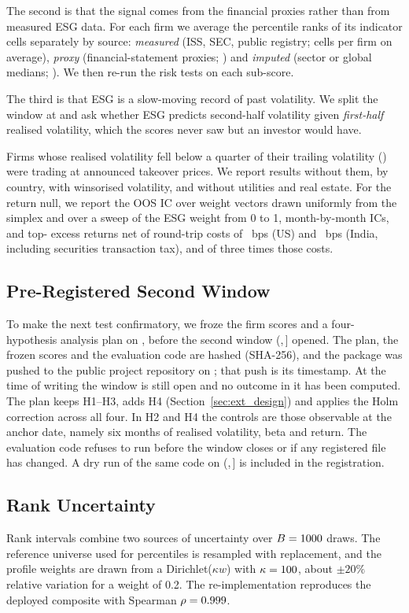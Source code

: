 The second is that the signal comes from the financial proxies rather than
from measured ESG data. For each firm we average the percentile ranks of its
indicator cells separately by source: \emph{measured} (ISS, SEC, public
registry; \CellsMeas cells per firm on average), \emph{proxy}
(financial-statement proxies; \CellsProxy) and \emph{imputed} (sector or
global medians; \CellsImp). We then re-run the risk tests on each sub-score.

The third is that ESG is a slow-moving record of past volatility. We split
the window at \SplitDate and ask whether ESG predicts second-half volatility
given \emph{first-half} realised volatility, which the scores never saw but
an investor would have.

Firms whose realised volatility fell below a quarter of their trailing
volatility (\PinnedTickers) were trading at announced takeover prices. We
report results without them, by country, with winsorised volatility, and
without utilities and real estate. For the return null, we report the OOS
IC over \WDraws weight vectors drawn uniformly from the simplex and over a
sweep of the ESG weight from 0 to 1, month-by-month ICs, and top-\TopN
excess returns net of round-trip costs of \CostBpsUS~bps (US) and
\CostBpsIndia~bps (India, including securities transaction tax), and of
three times those costs.

\subsection{Pre-Registered Second Window}
\label{sec:prereg_design}

To make the next test confirmatory, we froze the \NMid firm scores and a
four-hypothesis analysis plan on \PreregFrozen, before the second window
(\PreregAnchor,\,\PreregEnd] opened. The plan, the frozen scores and the
evaluation code are hashed (SHA-256), and the package was pushed to the
public project repository on \PreregFrozen; that push is its timestamp. At
the time of writing the window is still open and no outcome in it has been
computed. The plan keeps H1--H3, adds H4 (Section~\ref{sec:ext_design}) and
applies the Holm correction across all four. In H2 and H4 the controls are
those observable at the anchor date, namely six months of realised
volatility, beta and return. The evaluation code refuses to run before the
window closes or if any registered file has changed. A dry run of the same
code on (\DryAnchor,\,\DryEnd] is included in the registration.

\subsection{Rank Uncertainty}
\label{sec:rank_design}

Rank intervals combine two sources of uncertainty over $B=1000$ draws. The
reference universe used for percentiles is resampled with replacement, and
the profile weights are drawn from a Dirichlet($\kappa w$) with
$\kappa=100$, about $\pm20\%$ relative variation for a weight of 0.2.
The re-implementation reproduces the deployed composite with Spearman
$\rho=0.999$.
